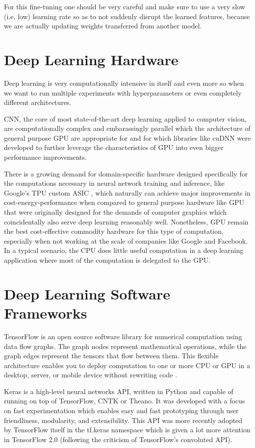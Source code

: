 For this fine-tuning one should be very careful and make sure to use a very slow (i.e. low) learning rate so as to not suddenly disrupt the learned features, because we are actually updating weights transferred from another model.

\section{Deep Learning Hardware}

Deep learning is very computationally intensive in itself and even more so when we want to run multiple experiments with hyperparameters or even completely different architectures.

\ac{CNN}, the core of most state-of-the-art deep learning applied to computer vision, are computationally complex and embarassingly parallel \cite{chang2017} which the architecture of general purpose \ac{GPU} are appropriate for \cite{gpu} and for which libraries like cuDNN \cite{cudnn} were developed to further leverage the characteristics of \ac{GPU} into even bigger performance improvements.

There is a growing demand for domain-specific hardware designed specifically for the computations necessary in neural network training and inference, like Google's TPU custom ASIC \cite{tpu}, which naturally can achieve major improvements in cost-energy-performance when compared to general purpose hardware like \ac{GPU} that were originally designed for the demands of computer graphics which coincidentally also serve deep learning reasonably well. Nonetheless, \ac{GPU} remain the best cost-effective commodity hardware for this type of computation, especially when not working at the scale of companies like Google and Facebook. In a typical scenario, the CPU does little useful computation in a deep learning application where most of the computation is delegated to the GPU.


\section{Deep Learning Software Frameworks}

TensorFlow is an open source software library for numerical computation using data flow graphs. The graph nodes represent mathematical operations, while the graph edges represent the tensors that flow between them. This flexible architecture enables you to deploy computation to one or more CPU or GPU in a desktop, server, or mobile device without rewriting code \cite{tensorflow}.

Keras is a high-level neural networks API, written in Python and capable of running on top of TensorFlow, CNTK or Theano. It was developed with a focus on fast experimentation which enables easy and fast prototyping through user friendliness, modularity, and extensibility. This API was more recently adopted by TensorFlow itself in the tf.keras namespace which is given a lot more attention in TensorFlow 2.0 (following the criticism of TensorFlow's convoluted API).


